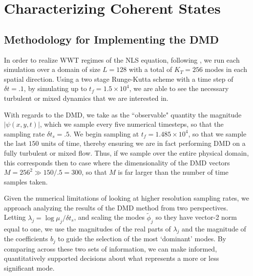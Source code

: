\documentclass[a4paper,11pt]{article}
\begin{document}
\section*{Characterizing Coherent States}

\subsection*{Methodology for Implementing the DMD}

In order to realize WWT regimes of the NLS equation, following \cite{nazarenko2}, we run each simulation over a domain of size $L=128$ with a total of $K_{T}=256$ modes in each spatial direction.  Using a two stage Runge-Kutta scheme with a time step of $\delta t=.1$, by simulating up to $t_{f}=1.5\times 10^{4}$, we are able to see the necessary turbulent or mixed dynamics that we are interested in.  

With regards to the DMD, we take as the ``observable" quantity the magnitude $|\psi(x,y,t)|$, which we sample every five numerical timesteps, so that the sampling rate $\delta t_{s}=.5$.  We begin sampling at $t_{f}=1.485\times10^{4}$, so that we sample the last $150$ units of time, thereby ensuring we are in fact performing DMD on a fully turbulent or mixed flow.  Thus, if we sample over the entire physical domain, this corresponds then to case where the dimensionality of the DMD vectors $M = 256^2 \gg 150/.5 = 300$, so that $M$ is far larger than the number of time samples taken. 

 Given the numerical limitations of looking at higher resolution sampling rates, we approach analyzing the results of the DMD method from two perspectives.  Letting $\lambda_{j} = \log \mu_{j}/\delta t_{s}$, and scaling the modes $\tilde{\phi}_{j}$ so they have vector-2 norm equal to one, we use the magnitudes of the real parts of $\lambda_{j}$ and the magnitude of the coefficients $b_{j}$ to guide the selection of the most `dominant' modes.  By comparing across these two sets of information, we can make informed, quantitatively supported decisions about what represents a more or less significant mode.  
\end{document}
